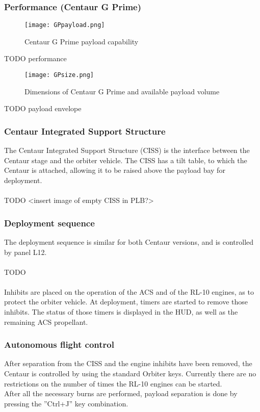 \documentclass[Space_Shuttle_Ultra_Manual.tex]{subfiles}
\begin{document}
\begin{multicols*}{2}
\subsubsection{Performance (Centaur G Prime)}
\begin{figure}[H]
	\centering
	\captionsetup{justification=centering}
  \texttt{[image: GPpayload.png]}
  \caption{Centaur G Prime payload capability}
  \label{fig:GPpayload}
\end{figure}
TODO performance

\begin{figure}[H]
	\centering
	\captionsetup{justification=centering}
  \texttt{[image: GPsize.png]}
  \caption{Dimensions of Centaur G Prime and available payload volume}
  \label{fig:Gpsize}
\end{figure}
TODO payload envelope

\subsubsection{Centaur Integrated Support Structure}
The Centaur Integrated Support Structure (CISS) is the interface between the Centaur stage and the orbiter vehicle. The CISS has a tilt table, to which the Centaur is attached, allowing it to be raised above the payload bay for deployment.
\\
\\
TODO <insert image of empty CISS in PLB?>

\subsubsection{Deployment sequence}
The deployment sequence is similar for both Centaur versions, and is controlled by panel L12.
\\
\\
TODO
\\
\\
Inhibits are placed on the operation of the ACS and of the RL-10 engines, as to protect the orbiter vehicle. At deployment, timers are started to remove those inhibits. The status of those timers is displayed in the HUD, as well as the remaining ACS propellant.

\subsubsection{Autonomous flight control}
After separation from the CISS and the engine inhibits have been removed, the Centaur is controlled by using the standard Orbiter keys. Currently there are no restrictions on the number of times the RL-10 engines can be started.
\\
After all the necessary burns are performed, payload separation is done by pressing the ''Ctrl+J'' key combination.


\end{multicols*}
\end{document}
